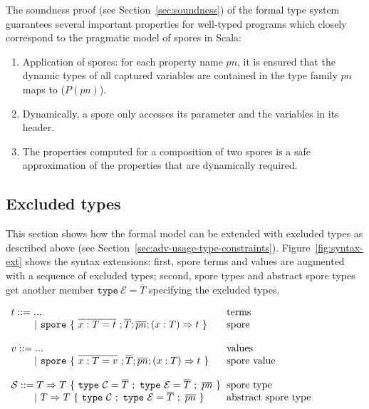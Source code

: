 \documentclass[a4paper,twoside]{article}
\newcommand{\seq}[1]{\overline{#1}}
\newcommand{\ba}{\begin{array}}
\newcommand{\ea}{\end{array}}
\newcommand{\gap}{\quad\quad}
\begin{document}
The soundness proof (see Section~\ref{sec:soundness}) of the formal type system guarantees several important properties for well-typed programs which closely correspond to the pragmatic model of spores in Scala:

\begin{enumerate}

\item Application of spores: for each property name $pn$, it is ensured that the dynamic types of all captured variables are contained in the type family $pn$ maps to ($P(pn)$).

\item Dynamically, a spore only accesses its parameter and the variables in its header.

\item The properties computed for a composition of two spores is a safe approximation of the properties that are dynamically required.

\end{enumerate}


\subsection{Excluded types}

This section shows how the formal model can be extended with excluded types as described above (see Section~\ref{sec:adv-usage-type-constraints}). Figure~\ref{fig:syntax-ext} shows the syntax extensions: first, spore terms and values are augmented with a sequence of excluded types; second, spore types and abstract spore types get another member $\texttt{type}~\mathcal{E} = \seq{T}$ specifying the excluded types.

\begin{figure*}[ht!]
  \centering

  $\ba[t]{l@{\hspace{2mm}}l}
t ::=     ...                               & \mbox{terms}
\\
\gap ~|~  \texttt{spore}~\{~\seq{x : T = t}~; \seq{T}; \seq{pn} ; (x: T) \Rightarrow t~\}  & \mbox{spore}
\\
 & \\
v ::=     ...                               & \mbox{values}
\\
\gap ~|~  \texttt{spore}~\{~\seq{x : T = v}~; \seq{T}; \seq{pn} ; (x: T) \Rightarrow t~\}  & \mbox{spore value}
\\
 & \\
\mathcal{S} ::= T \Rightarrow T~\{~\texttt{type}~\mathcal{C} = \seq{T}~;~\texttt{type}~\mathcal{E} = \seq{T}~;~\seq{pn}~\}   & \mbox{spore type}
\\
\gap ~|~  T \Rightarrow T~\{~\texttt{type}~\mathcal{C}~;~\texttt{type}~\mathcal{E} = \seq{T}~;~\seq{pn}~\}   & \mbox{abstract spore type}
\\
\ea$

  \caption{Core language syntax extensions}
  \label{fig:syntax-ext}
\end{figure*}
\end{document}
